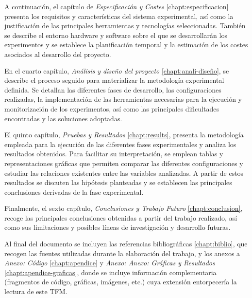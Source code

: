  A continuación, el capítulo de \textit{Especificación y Costes} \ref{chapt:especificacion} presenta los requisitos y características del sistema experimental, así como la justificación de las principales herramientas y tecnologías seleccionadas. También se describe el entorno hardware y software sobre el que se desarrollarán los experimentos y se establece la planificación temporal y la estimación de los costes asociados al desarrollo del proyecto.

 En el cuarto capítulo, \textit{Análisis y diseño del proyecto} \ref{chapt:anali-diseño}, se describe el proceso seguido para materializar la metodología experimental definida. Se detallan las diferentes fases de desarrollo, las configuraciones realizadas, la implementación de las herramientas necesarias para la ejecución y monitorización de los experimentos, así como las principales dificultades encontradas y las soluciones adoptadas.

 El quinto capítulo, \textit{Pruebas y Resultados} \ref{chapt:results}, presenta la metodología empleada para la ejecución de las diferentes fases experimentales y analiza los resultados obtenidos. Para facilitar su interpretación, se emplean tablas y representaciones gráficas que permiten comparar las diferentes configuraciones y estudiar las relaciones existentes entre las variables analizadas. A partir de estos resultados se discuten las hipótesis planteadas y se establecen las principales conclusiones derivadas de la fase experimental.
 
 Finalmente, el sexto capítulo, \textit{Conclusiones y Trabajo Futuro} \ref{chapt:conclusion}, recoge las principales conclusiones obtenidas a partir del trabajo realizado, así como sus limitaciones y posibles líneas de investigación y desarrollo futuras.

 Al final del documento se incluyen las referencias bibliográficas \ref{chapt:biblio}, que recogen las fuentes utilizadas durante la elaboración del trabajo, y los anexos a \textit{Anexo: Código} \ref{chapt:apendice} y \textit{Anexo: Anexo: Gráficas y Resultados} \ref{chapt:apendice-graficas}, donde se incluye información complementaria (fragmentos de código, gráficas, imágenes, etc.) cuya extensión entorpecería la lectura de este TFM.
 
